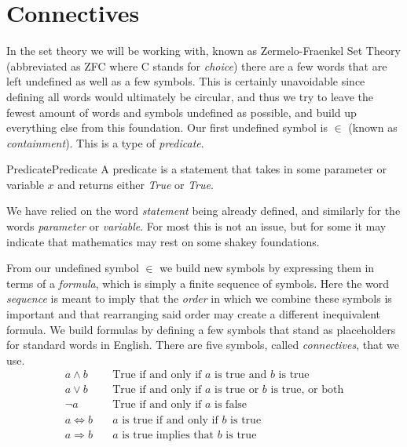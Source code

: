 \section{Connectives}
    In the set theory we will be working with, known as
    Zermelo-Fraenkel Set Theory (abbreviated as ZFC where C stands for
    \textit{choice}) there are a few words that are left undefined as well as a
    few symbols. This is certainly unavoidable since defining all words would
    ultimately be circular, and thus we try to leave the fewest amount of words
    and symbols undefined as possible, and build up everything else from this
    foundation. Our first undefined symbol is $\in$
    (known as \textit{containment}). This is a type of
    \textit{\gls{predicate}}.
    \begin{fdefinition}{Predicate}{Predicate}
        A \gls{predicate} is a statement that takes in some parameter or
        variable $x$ and returns either \textit{True} or \textit{True}.
    \end{fdefinition}
    We have relied on the word \textit{statement} being already defined, and
    similarly for the words \textit{parameter} or \textit{variable}. For most
    this is not an issue, but for some it may indicate that mathematics may rest
    on some shakey foundations.
    \par\hfill\par
    From our undefined symbol $\in$ we build new symbols by expressing them in
    terms of a \textit{formula}, which is simply a finite
    sequence of symbols. Here the word \textit{sequence} is meant to imply that
    the \textit{order} in which we combine these symbols is important and that
    rearranging said order may create a different inequivalent formula. We build
    formulas by defining a few symbols that stand as placeholders for standard
    words in English. There are five symbols, called
    \textit{\glspl{connective}}, that we use.
    \begin{align*}
        a\land{b}\quad
        &\textrm{True if and only if }a
        \textrm{ is true and }b\textrm{ is true}
        \tag{Conjunction}\\
        a\lor{b}\quad
        &\textrm{True if and only if }a
        \textrm{ is true or }b\textrm{ is true, or both}
        \tag{Disjunction}\\
        \neg{a}\quad
        &\textrm{True if and only if }a\textrm{ is false}
        \tag{Negation}\\
        a\Leftrightarrow{b}\quad
        &a\textrm{ is true if and only if }b\textrm{ is true}
        \tag{Equivalence}\\
        a\Rightarrow{b}\quad
        &a\textrm{ is true implies that }b\textrm{ is true}
        \tag{Implication}
    \end{align*}

